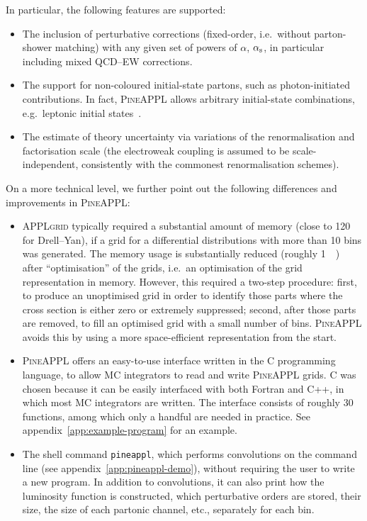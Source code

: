 In particular, the following features are supported:
\begin{itemize}
\item The inclusion of perturbative corrections (fixed-order, i.e.\ without parton-shower matching) with any given set of powers of $\alpha$, $\alpha_\mathrm{s}$, in particular including mixed QCD--EW corrections.
\item The support for non-coloured initial-state partons, such as photon-initiated contributions.
In fact, \textsc{PineAPPL} allows arbitrary initial-state combinations, e.g.\ leptonic initial states~\cite{Bertone:2015lqa,Buonocore:2020nai}.
\item The estimate of theory uncertainty via variations of the renormalisation and factorisation scale (the electroweak coupling is assumed to be scale-independent, consistently with the commonest renormalisation schemes).
\end{itemize}
On a more technical level, we further point out the following differences and improvements in \textsc{PineAPPL}:
\begin{itemize}
\item \textsc{APPLgrid} typically required a substantial amount of memory (close to \SI{120}{\giga\byte} for Drell--Yan), if a grid for a differential distributions with more than 10 bins was generated.
The memory usage is substantially reduced (roughly \SI{1}{\giga\byte}) after \enquote{optimisation} of the grids, i.e.\ an optimisation of the grid representation in memory.
However, this required a two-step procedure: first, to produce an unoptimised grid in order to identify those parts where the cross section is either zero or extremely suppressed; second, after those parts are removed, to fill an optimised grid with a small number of bins.
\textsc{PineAPPL} avoids this by using a more space-efficient representation from the start.
\item \textsc{PineAPPL} offers an easy-to-use interface written in the C programming language, to allow MC integrators to read and write \textsc{PineAPPL} grids.
C was chosen because it can be easily interfaced with both Fortran and C++, in which most MC integrators are written.
The interface consists of roughly 30 functions, among which only a handful are needed in practice.
See appendix~\ref{app:example-program} for an example.
\item The shell command \texttt{pineappl}, which performs convolutions on the command line (see appendix~\ref{app:pineappl-demo}), without requiring the user to write a new program.
In addition to convolutions, it can also print how the luminosity function is constructed, which perturbative orders are stored, their size, the size of each partonic channel, etc., separately for each bin.
\end{itemize}

